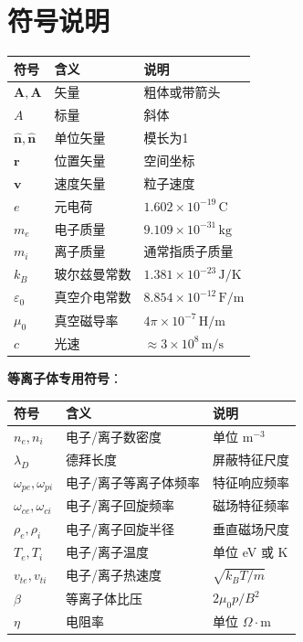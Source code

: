 \documentclass[12pt,a4paper,openany,oneside]{book}
\newcommand{\eps}{\varepsilon}
\newcommand{\vect}[1]{\bm{#1}}
\newcommand{\unitvec}[1]{\hat{\vect{#1}}}
\begin{document}
\chapter*{符号说明}
\begin{center}
\begin{tabular}{lll}
\toprule
\textbf{符号} & \textbf{含义} & \textbf{说明} \\
\midrule
$\vect{A}, \bm{A}$ & 矢量 & 粗体或带箭头 \\
$A$ & 标量 & 斜体 \\
$\hat{\vect{n}}, \unitvec{n}$ & 单位矢量 & 模长为1 \\
$\vect{r}$ & 位置矢量 & 空间坐标 \\
$\vect{v}$ & 速度矢量 & 粒子速度 \\
$e$ & 元电荷 & $1.602\times 10^{-19}\,\mathrm{C}$ \\
$m_e$ & 电子质量 & $9.109\times 10^{-31}\,\mathrm{kg}$ \\
$m_i$ & 离子质量 & 通常指质子质量 \\
$k_B$ & 玻尔兹曼常数 & $1.381\times 10^{-23}\,\mathrm{J/K}$ \\
$\eps_0$ & 真空介电常数 & $8.854\times 10^{-12}\,\mathrm{F/m}$ \\
$\mu_0$ & 真空磁导率 & $4\pi\times 10^{-7}\,\mathrm{H/m}$ \\
$c$ & 光速 & $\approx 3\times 10^8\,\mathrm{m/s}$ \\
\bottomrule
\end{tabular}
\end{center}
\vspace{1em}
\noindent\textbf{等离子体专用符号}：
\begin{center}
\begin{tabular}{lll}
\toprule
\textbf{符号} & \textbf{含义} & \textbf{说明} \\
\midrule
$n_e, n_i$ & 电子/离子数密度 & 单位 $\mathrm{m}^{-3}$ \\
$\lambda_D$ & 德拜长度 & 屏蔽特征尺度 \\
$\omega_{pe}, \omega_{pi}$ & 电子/离子等离子体频率 & 特征响应频率 \\
$\omega_{ce}, \omega_{ci}$ & 电子/离子回旋频率 & 磁场特征频率 \\
$\rho_e, \rho_i$ & 电子/离子回旋半径 & 垂直磁场尺度 \\
$T_e, T_i$ & 电子/离子温度 & 单位 eV 或 K \\
$v_{te}, v_{ti}$ & 电子/离子热速度 & $\sqrt{k_BT/m}$ \\
$\beta$ & 等离子体比压 & $2\mu_0 p/B^2$ \\
$\eta$ & 电阻率 & 单位 $\Omega\cdot\mathrm{m}$ \\
\bottomrule
\end{tabular}
\end{center}
\end{document}
